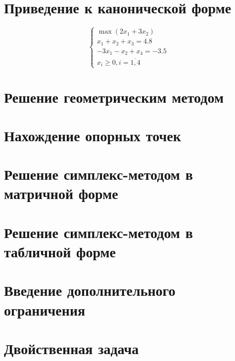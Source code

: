 \section{Приведение к канонической форме}

\begin{equation*}
\begin{cases}
	\max \left( 2 x_1 + 3 x_2 \right) \\
	x_1 + x_2 + x_3 = 4.8 \\
	-3 x_1 - x_2 + x_4 = -3.5 \\
	x_i \ge 0, i = \overline{1,4}
\end{cases}
\end{equation*}

\section{Решение геометрическим методом}

\section{Нахождение опорных точек}

\section{Решение симплекс-методом в матричной форме}

\section{Решение симплекс-методом в табличной форме}

\section{Введение дополнительного ограничения}

\section{Двойственная задача}

